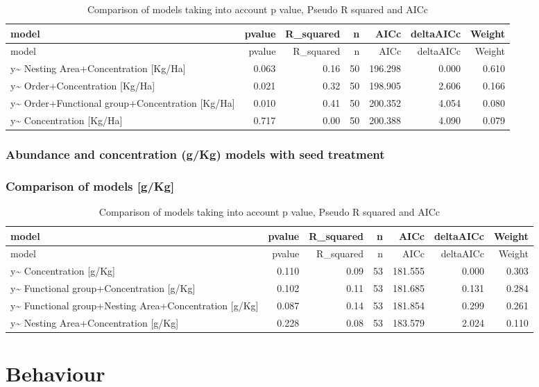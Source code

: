 \documentclass[]{elsarticle} %
\begin{document}
\begin{longtable}[c]{@{}lrrrrrr@{}}
\caption{Comparison of models taking into account p value, Pseudo R
squared and AICc}\tabularnewline
\toprule
model & pvalue & R\_squared & n & AICc & deltaAICc &
Weight\tabularnewline
\midrule
\endfirsthead
\toprule
model & pvalue & R\_squared & n & AICc & deltaAICc &
Weight\tabularnewline
\midrule
\endhead
y\textasciitilde{} Nesting Area+Concentration {[}Kg/Ha{]} & 0.063 & 0.16
& 50 & 196.298 & 0.000 & 0.610\tabularnewline
y\textasciitilde{} Order+Concentration {[}Kg/Ha{]} & 0.021 & 0.32 & 50 &
198.905 & 2.606 & 0.166\tabularnewline
y\textasciitilde{} Order+Functional group+Concentration {[}Kg/Ha{]} &
0.010 & 0.41 & 50 & 200.352 & 4.054 & 0.080\tabularnewline
y\textasciitilde{} Concentration {[}Kg/Ha{]} & 0.717 & 0.00 & 50 &
200.388 & 4.090 & 0.079\tabularnewline
\bottomrule
\end{longtable}

\subsubsection{Abundance and concentration (g/Kg) models with seed
treatment}\label{abundance-and-concentration-gkg-models-with-seed-treatment}

\subsubsection{Comparison of models
{[}g/Kg{]}}\label{comparison-of-models-gkg}

\begin{longtable}[c]{@{}lrrrrrr@{}}
\caption{Comparison of models taking into account p value, Pseudo R
squared and AICc}\tabularnewline
\toprule
model & pvalue & R\_squared & n & AICc & deltaAICc &
Weight\tabularnewline
\midrule
\endfirsthead
\toprule
model & pvalue & R\_squared & n & AICc & deltaAICc &
Weight\tabularnewline
\midrule
\endhead
y\textasciitilde{} Concentration {[}g/Kg{]} & 0.110 & 0.09 & 53 &
181.555 & 0.000 & 0.303\tabularnewline
y\textasciitilde{} Functional group+Concentration {[}g/Kg{]} & 0.102 &
0.11 & 53 & 181.685 & 0.131 & 0.284\tabularnewline
y\textasciitilde{} Functional group+Nesting Area+Concentration
{[}g/Kg{]} & 0.087 & 0.14 & 53 & 181.854 & 0.299 & 0.261\tabularnewline
y\textasciitilde{} Nesting Area+Concentration {[}g/Kg{]} & 0.228 & 0.08
& 53 & 183.579 & 2.024 & 0.110\tabularnewline
\bottomrule
\end{longtable}

\section{Behaviour}\label{behaviour}
\end{document}
